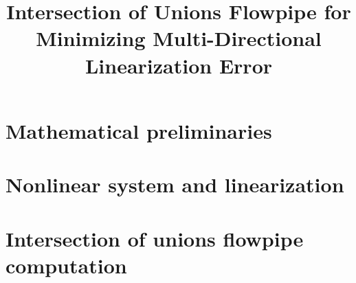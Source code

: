 


\title{Intersection of Unions Flowpipe for Minimizing Multi-Directional Linearization Error}
\author{}
\institute{}
%
    
\maketitle
%
\section{Mathematical preliminaries}

%
\section{Nonlinear system and linearization}

%
\section{Intersection of unions flowpipe computation}














